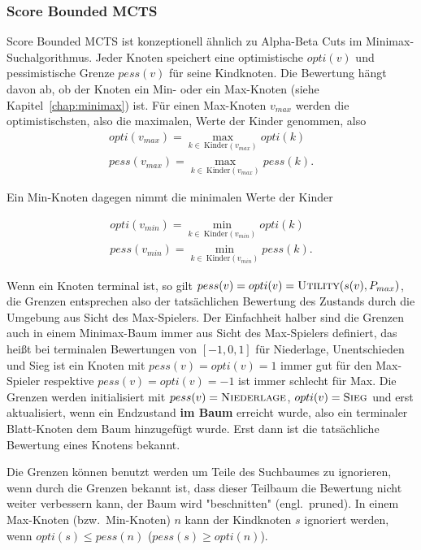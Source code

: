 \subsubsection{Score Bounded MCTS}
\label{chap:scorebounded}
Score Bounded MCTS ist konzeptionell ähnlich zu Alpha-Beta Cuts im Minimax-Such\-al\-gorithmus.
Jeder Knoten speichert eine optimistische $opti(v)$ und pessimistische Grenze $pess(v)$ für seine Kindknoten.
Die Bewertung hängt davon ab, ob der Knoten ein Min- oder ein Max-Knoten (siehe Kapitel~\ref{chap:minimax}) ist.
Für einen Max-Knoten $v_{max}$ werden die optimistischsten, also die maximalen, Werte der Kinder genommen, also
\begin{equation}
\begin{split}
opti(v_{max}) = \max_{k \in\ \text{Kinder}(v_{max})}opti(k)\\
pess(v_{max}) = \max_{k \in\ \text{Kinder}(v_{max})}pess(k).
\end{split}
\end{equation}

Ein Min-Knoten dagegen nimmt die minimalen Werte der Kinder 

\begin{equation}
\begin{split}
opti(v_{min}) = \min_{k \in\ \text{Kinder}(v_{min})}opti(k)\\
pess(v_{min}) = \min_{k \in\ \text{Kinder}(v_{min})}pess(k).
\end{split}
\end{equation}


Wenn ein Knoten terminal ist, so gilt $pess(v) = opti(v) = \textsc{Utility}(s(v),P_{max})$, die Grenzen entsprechen also der tatsächlichen Bewertung des Zustands durch die Umgebung aus Sicht des Max-Spielers. Der Einfachheit halber sind die Grenzen auch in einem Minimax-Baum immer aus Sicht des Max-Spielers definiert, das heißt bei terminalen Bewertungen von $[-1, 0, 1]$ für Niederlage, Unentschieden und Sieg ist ein Knoten mit $pess(v) = opti(v) = 1$ immer gut für den Max-Spieler respektive $pess(v) = opti(v) = -1$ ist immer schlecht für Max. Die Grenzen werden initialisiert mit $pess(v) = \textsc{Niederlage}$, $opti(v) = \textsc{Sieg}$ und erst aktualisiert, wenn ein Endzustand \textbf{im Baum} erreicht wurde, also ein terminaler Blatt-Knoten dem Baum hinzugefügt wurde.
Erst dann ist die tatsächliche Bewertung eines Knotens bekannt.

Die Grenzen können benutzt werden um Teile des Suchbaumes zu ignorieren, wenn durch die Grenzen bekannt ist, dass dieser Teilbaum die Bewertung nicht weiter verbessern kann, der Baum wird "beschnitten" (engl.\ pruned).
In einem Max-Knoten (bzw.\ Min-Knoten) $n$ kann der Kindknoten $s$ ignoriert werden, wenn $opti(s) \le pess(n)$ ($pess(s) \ge opti(n)$).\autocite[\ppno~5]{cazenaveScoreBoundedMonteCarlo2011}

